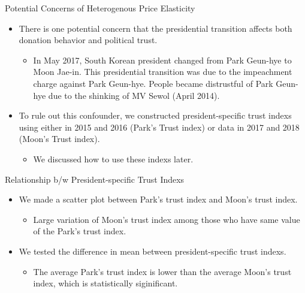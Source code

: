 \documentclass[
  ignorenonframetext,
]{beamer}
\providecommand{\tightlist}{%
  \setlength{\itemsep}{0pt}\setlength{\parskip}{0pt}}
\begin{document}
\begin{frame}{Potential Concerns of Heterogenous Price Elasticity}
\protect\hypertarget{potential-concerns-of-heterogenous-price-elasticity}{}
\begin{itemize}
\tightlist
\item
  There is one potential concern that the presidential transition
  affects both donation behavior and political trust.

  \begin{itemize}
  \tightlist
  \item
    In May 2017, South Korean president changed from Park Geun-hye to
    Moon Jae-in. This presidential transition was due to the impeachment
    charge against Park Geun-hye. People became distrustful of Park
    Geun-hye due to the shinking of MV Sewol (April 2014).
  \end{itemize}
\item
  To rule out this confounder, we constructed president-specific trust
  indexs using either in 2015 and 2016 (Park's Trust index) or data in
  2017 and 2018 (Moon's Trust index).

  \begin{itemize}
  \tightlist
  \item
    We discussed how to use these indexs later.
  \end{itemize}
\end{itemize}
\end{frame}

\begin{frame}{Relationship b/w President-specific Trust Indexs}
\protect\hypertarget{relationship-bw-president-specific-trust-indexs}{}
\begin{itemize}
\tightlist
\item
  We made a scatter plot between Park's trust index and Moon's trust
  index.

  \begin{itemize}
  \tightlist
  \item
    Large variation of Moon's trust index among those who have same
    value of the Park's trust index.
  \end{itemize}
\item
  We tested the difference in mean between president-specific trust
  indexs.

  \begin{itemize}
  \tightlist
  \item
    The average Park's trust index is lower than the average Moon's
    trust index, which is statistically siginificant.
  \end{itemize}
\end{itemize}
\end{frame}
\end{document}
